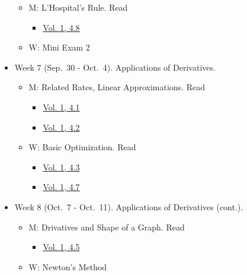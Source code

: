 \documentclass[
]{article}
\providecommand{\tightlist}{%
  \setlength{\itemsep}{0pt}\setlength{\parskip}{0pt}}
\begin{document}
\begin{itemize}
  \begin{itemize}
  \tightlist
  \item
    M: L'Hospital's Rule. Read

    \begin{itemize}
    \tightlist
    \item
      \href{https://openstax.org/books/calculus-volume-1/pages/4-8-lhopitals-rule}{Vol. 1, 4.8}
    \end{itemize}
  \item
    W: Mini Exam 2
  \end{itemize}
\item
  Week 7 (Sep.~30 - Oct.~4). Applications of Derivatives.

  \begin{itemize}
  \tightlist
  \item
    M: Related Rates, Linear Approximations. Read

    \begin{itemize}
    \tightlist
    \item
      \href{https://openstax.org/books/calculus-volume-1/pages/4-1-related-rates}{Vol. 1, 4.1}
    \item
      \href{https://openstax.org/books/calculus-volume-1/pages/4-2-linear-approximations-and-differentials}{Vol. 1, 4.2}
    \end{itemize}
  \item
    W: Basic Optimization. Read

    \begin{itemize}
    \tightlist
    \item
      \href{https://openstax.org/books/calculus-volume-1/pages/4-3-maxima-and-minima}{Vol. 1, 4.3}
    \item
      \href{https://openstax.org/books/calculus-volume-1/pages/4-7-applied-optimization-problems}{Vol. 1, 4.7}
    \end{itemize}
  \end{itemize}
\item
  Week 8 (Oct.~7 - Oct.~11). Applications of Derivatives (cont.).

  \begin{itemize}
  \tightlist
  \item
    M: Drivatives and Shape of a Graph. Read

    \begin{itemize}
    \tightlist
    \item
      \href{https://openstax.org/books/calculus-volume-1/pages/4-5-derivatives-and-the-shape-of-a-graph}{Vol. 1, 4.5}
    \end{itemize}
  \item
    W: Newton's Method


\end{itemize}
\end{itemize}
\end{document}
